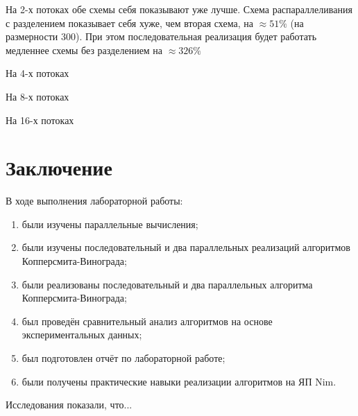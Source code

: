 \documentclass[12pt]{report}
\begin{document}
На 2-х потоках обе схемы себя показывают уже лучше. Схема распараллеливания с разделением показывает себя хуже, чем вторая схема, на $\approx 51\%$ (на размерности 300). При этом последовательная реализация будет работать медленнее схемы без разделением на $\approx 326\%$

На 4-х потоках

На 8-х потоках

На 16-х потоках

\chapter*{Заключение}
В ходе выполнения лабораторной работы:
\begin{enumerate}
\item были изучены параллельные вычисления;
\item были изучены последовательный и два параллельных реализаций алгоритмов Копперсмита-Винограда;
\item были реализованы последовательный и два параллельных алгоритма Копперсмита-Винограда;
\item был проведён сравнительный анализ алгоритмов на основе экспериментальных данных;
\item был подготовлен отчёт по лабораторной работе;
\item были получены практические навыки реализации алгоритмов на ЯП Nim.
\end{enumerate}

Исследования показали, что...

\end{document}
